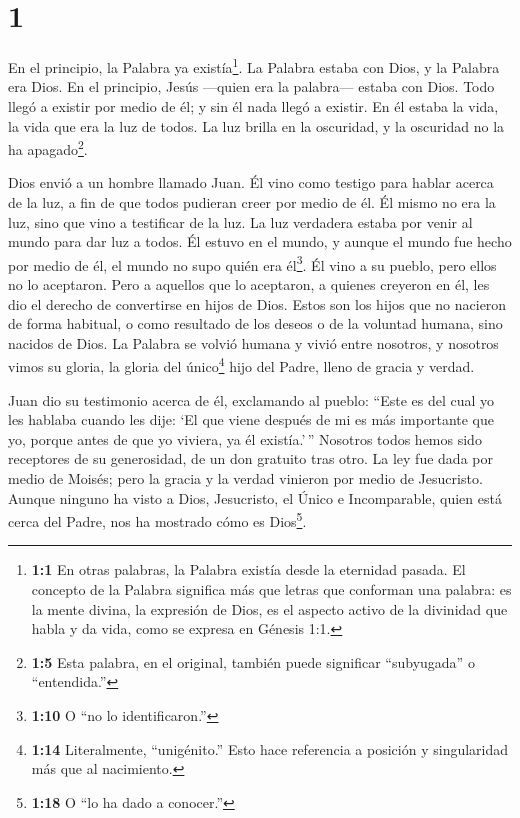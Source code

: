 \hypertarget{section}{%
\section{1}\label{section}}

 En el principio, la Palabra ya existía\footnote{\textbf{1:1}
  En otras palabras, la Palabra existía desde la eternidad pasada. El
  concepto de la Palabra significa más que letras que conforman una
  palabra: es la mente divina, la expresión de Dios, es el aspecto
  activo de la divinidad que habla y da vida, como se expresa en Génesis
  1:1.}. La Palabra estaba con Dios, y la Palabra era Dios. 
En el principio, Jesús ---quien era la palabra--- estaba con Dios.
 Todo llegó a existir por medio de él; y sin él nada llegó a
existir.  En él estaba la vida, la vida que era la luz de
todos.  La luz brilla en la oscuridad, y la oscuridad no la
ha apagado\footnote{\textbf{1:5} Esta palabra, en el original, también
  puede significar ``subyugada'' o ``entendida.''}.

 Dios envió a un hombre llamado Juan.  Él vino
como testigo para hablar acerca de la luz, a fin de que todos pudieran
creer por medio de él.  Él mismo no era la luz, sino que
vino a testificar de la luz.  La luz verdadera estaba por
venir al mundo para dar luz a todos.  Él estuvo en el
mundo, y aunque el mundo fue hecho por medio de él, el mundo no supo
quién era él\footnote{\textbf{1:10} O ``no lo identificaron.''}.
 Él vino a su pueblo, pero ellos no lo aceptaron.
 Pero a aquellos que lo aceptaron, a quienes creyeron en
él, les dio el derecho de convertirse en hijos de Dios. 
Estos son los hijos que no nacieron de forma habitual, o como resultado
de los deseos o de la voluntad humana, sino nacidos de Dios.
 La Palabra se volvió humana y vivió entre nosotros, y
nosotros vimos su gloria, la gloria del único\footnote{\textbf{1:14}
  Literalmente, ``unigénito.'' Esto hace referencia a posición y
  singularidad más que al nacimiento.} hijo del Padre, lleno de gracia y
verdad.

 Juan dio su testimonio acerca de él, exclamando al pueblo:
``Este es del cual yo les hablaba cuando les dije: `El que viene después
de mi es más importante que yo, porque antes de que yo viviera, ya él
existía.'\,''  Nosotros todos hemos sido receptores de su
generosidad, de un don gratuito tras otro.  La ley fue dada
por medio de Moisés; pero la gracia y la verdad vinieron por medio de
Jesucristo.  Aunque ninguno ha visto a Dios, Jesucristo, el
Único e Incomparable, quien está cerca del Padre, nos ha mostrado cómo
es Dios\footnote{\textbf{1:18} O ``lo ha dado a conocer.''}.

